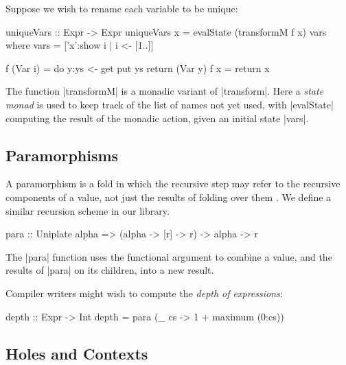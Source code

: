 \begin{example}
Suppose we wish to rename each variable to be unique:

\begin{code}
uniqueVars :: Expr -> Expr
uniqueVars x = evalState (transformM f x) vars
    where
        vars = ['x':show i | i <- [1..]]

        f (Var i)  = do  y:ys <- get
                         put ys
                         return (Var y)
        f x        = return x
\end{code}

The function |transformM| is a monadic variant of |transform|. Here a \textit{state monad} is used to keep track of the list of names not yet used, with |evalState| computing the result of the monadic action, given an initial state |vars|.
\end{example}

\subsection{Paramorphisms}

A paramorphism is a fold in which the recursive step may refer to the recursive components of a value, not just the results of folding over them \cite{meertens:paramorphisms}. We define a similar recursion scheme in our library.

\begin{code}
para :: Uniplate alpha => (alpha -> [r] -> r) -> alpha -> r
\end{code}

The |para| function uses the functional argument to combine a value, and the results of |para| on its children, into a new result.

\begin{example}
Compiler writers might wish to compute the \textit{depth of expressions}:

\begin{code}
depth :: Expr -> Int
depth = para (\_ cs -> 1 + maximum (0:cs))
\end{code}\codeexample
\end{example}

\subsection{Holes and Contexts}
\label{secU:holes_contexts}


